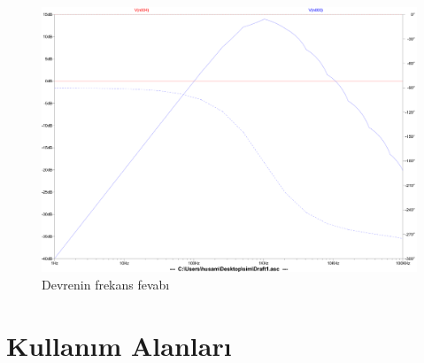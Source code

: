 \documentclass[]{scrartcl}
\begin{document}
\begin{figure}
	\shorthandoff{=}
	\includegraphics[width=\linewidth]{Draft2}
	\shorthandon{=}
	\caption{Devrenin frekans fevabı}
\end{figure}

\section{Kullanım Alanları}
\end{document}
